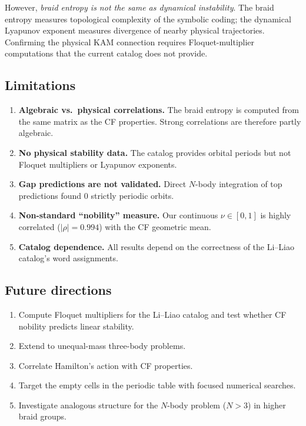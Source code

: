 \documentclass[11pt]{article}
\theoremstyle{definition}
\begin{document}
However, \emph{braid entropy is not the same as dynamical
instability}.  The braid entropy measures topological complexity of
the symbolic coding; the dynamical Lyapunov exponent measures
divergence of nearby physical trajectories.  Confirming the physical
KAM connection requires Floquet-multiplier computations that the
current catalog does not provide.

\subsection{Limitations}

\begin{enumerate}
\item \textbf{Algebraic vs.\ physical correlations.} The braid
  entropy is computed from the same matrix as the CF properties.
  Strong correlations are therefore partly algebraic.

\item \textbf{No physical stability data.} The catalog provides
  orbital periods but not Floquet multipliers or Lyapunov exponents.

\item \textbf{Gap predictions are not validated.} Direct $N$-body
  integration of top predictions found 0 strictly periodic orbits.

\item \textbf{Non-standard ``nobility'' measure.} Our continuous
  $\nu \in [0,1]$ is highly correlated ($|\rho| = 0.994$) with the
  CF geometric mean.

\item \textbf{Catalog dependence.} All results depend on the
  correctness of the Li--Liao catalog's word assignments.
\end{enumerate}

\subsection{Future directions}

\begin{enumerate}
\item Compute Floquet multipliers for the Li--Liao catalog and test
  whether CF nobility predicts linear stability.
\item Extend to unequal-mass three-body problems.
\item Correlate Hamilton's action with CF properties.
\item Target the empty cells in the periodic table with focused
  numerical searches.
\item Investigate analogous structure for the $N$-body problem
  ($N > 3$) in higher braid groups.
\end{enumerate}
\end{document}
